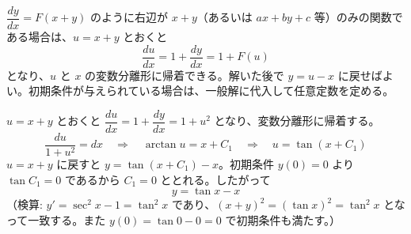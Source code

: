 
$\dfrac{dy}{dx} = F(x+y)$ のように右辺が $x+y$（あるいは $ax+by+c$ 等）のみの関数である場合は、$u = x+y$ とおくと
\[
\frac{du}{dx} = 1 + \frac{dy}{dx} = 1 + F(u)
\]
となり、$u$ と $x$ の変数分離形に帰着できる。解いた後で $y = u - x$ に戻せばよい。初期条件が与えられている場合は、一般解に代入して任意定数を定める。

$u = x + y$ とおくと $\dfrac{du}{dx} = 1 + \dfrac{dy}{dx} = 1 + u^{2}$ となり、変数分離形に帰着する。
\[
\frac{du}{1+u^{2}} = dx
\quad\Longrightarrow\quad
\arctan u = x + C_{1}
\quad\Longrightarrow\quad
u = \tan(x+C_{1})
\]
$u = x+y$ に戻すと $y = \tan(x+C_{1}) - x$。初期条件 $y(0) = 0$ より $\tan C_{1} = 0$ であるから $C_{1} = 0$ ととれる。したがって
\[
\boxed{\; y = \tan x - x \;}
\]
（検算: $y' = \sec^{2}x - 1 = \tan^{2}x$ であり、$(x+y)^{2} = (\tan x)^{2} = \tan^{2}x$ となって一致する。また $y(0) = \tan 0 - 0 = 0$ で初期条件も満たす。）
